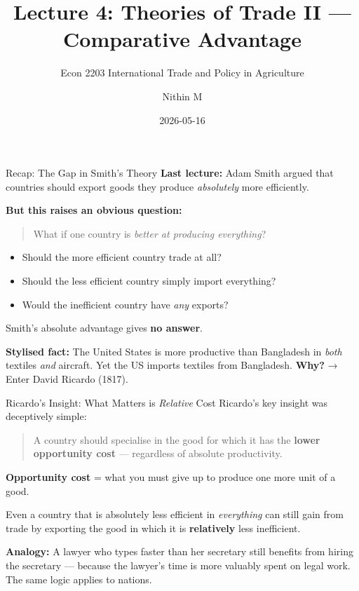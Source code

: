\documentclass[
  ignorenonframetext,
  aspectratio=169,
]{beamer}
\title[L4 \textbar{} Comparative Advantage]{Lecture 4: Theories of Trade
II --- Comparative Advantage}
\subtitle{Econ 2203 \textbar{} International Trade and Policy in
Agriculture}
\author{Nithin M}
\date{2026-05-16}
\institute{Department of Development Economics}
\makeatletter
\providecommand{\tightlist}{%
  \setlength{\itemsep}{0pt}\setlength{\parskip}{0pt}}
\let\quarto@originallabel\label
\DeclareRobustCommand*{\label}[1]{\quarto@originallabel{#1}}
\makeatother
\begin{document}
\frame{\titlepage}


\begin{frame}{Recap: The Gap in Smith's Theory}
\label{recap-the-gap-in-smiths-theory}
\textbf{Last lecture:} Adam Smith argued that countries should export
goods they produce \emph{absolutely} more efficiently.

\textbf{But this raises an obvious question:}

\begin{quote}
What if one country is \emph{better at producing everything}?
\end{quote}

\begin{itemize}
\tightlist
\item
  Should the more efficient country trade at all?
\item
  Should the less efficient country simply import everything?
\item
  Would the inefficient country have \emph{any} exports?
\end{itemize}

Smith's absolute advantage gives \textbf{no answer}.

\textbf{Stylised fact:} The United States is more productive than
Bangladesh in \emph{both} textiles \emph{and} aircraft. Yet the US
imports textiles from Bangladesh. \textbf{Why?} → Enter David Ricardo
(1817).
\end{frame}

\begin{frame}{Ricardo's Insight: What Matters is \emph{Relative} Cost}
\label{ricardos-insight-what-matters-is-relative-cost}
Ricardo's key insight was deceptively simple:

\begin{quote}
A country should specialise in the good for which it has the
\textbf{lower opportunity cost} --- regardless of absolute productivity.
\end{quote}

\textbf{Opportunity cost} = what you must give up to produce one more
unit of a good.

Even a country that is absolutely less efficient in \emph{everything}
can still gain from trade by exporting the good in which it is
\textbf{relatively} less inefficient.

\textbf{Analogy:} A lawyer who types faster than her secretary still
benefits from hiring the secretary --- because the lawyer's time is more
valuably spent on legal work. The same logic applies to nations.
\end{frame}
\end{document}
